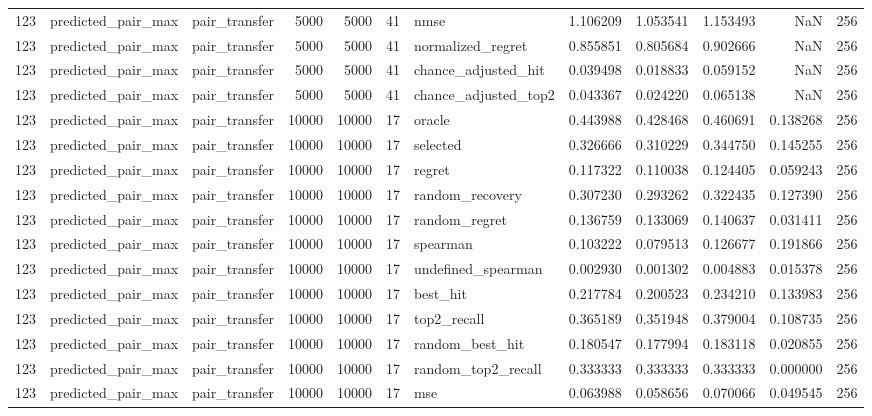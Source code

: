\begin{tabular}{rllrrrlrrrrr}
123 & predicted_pair_max & pair_transfer & 5000 & 5000 & 41 & nmse & 1.106209 & 1.053541 & 1.153493 & NaN & 256 \\
123 & predicted_pair_max & pair_transfer & 5000 & 5000 & 41 & normalized_regret & 0.855851 & 0.805684 & 0.902666 & NaN & 256 \\
123 & predicted_pair_max & pair_transfer & 5000 & 5000 & 41 & chance_adjusted_hit & 0.039498 & 0.018833 & 0.059152 & NaN & 256 \\
123 & predicted_pair_max & pair_transfer & 5000 & 5000 & 41 & chance_adjusted_top2 & 0.043367 & 0.024220 & 0.065138 & NaN & 256 \\
123 & predicted_pair_max & pair_transfer & 10000 & 10000 & 17 & oracle & 0.443988 & 0.428468 & 0.460691 & 0.138268 & 256 \\
123 & predicted_pair_max & pair_transfer & 10000 & 10000 & 17 & selected & 0.326666 & 0.310229 & 0.344750 & 0.145255 & 256 \\
123 & predicted_pair_max & pair_transfer & 10000 & 10000 & 17 & regret & 0.117322 & 0.110038 & 0.124405 & 0.059243 & 256 \\
123 & predicted_pair_max & pair_transfer & 10000 & 10000 & 17 & random_recovery & 0.307230 & 0.293262 & 0.322435 & 0.127390 & 256 \\
123 & predicted_pair_max & pair_transfer & 10000 & 10000 & 17 & random_regret & 0.136759 & 0.133069 & 0.140637 & 0.031411 & 256 \\
123 & predicted_pair_max & pair_transfer & 10000 & 10000 & 17 & spearman & 0.103222 & 0.079513 & 0.126677 & 0.191866 & 256 \\
123 & predicted_pair_max & pair_transfer & 10000 & 10000 & 17 & undefined_spearman & 0.002930 & 0.001302 & 0.004883 & 0.015378 & 256 \\
123 & predicted_pair_max & pair_transfer & 10000 & 10000 & 17 & best_hit & 0.217784 & 0.200523 & 0.234210 & 0.133983 & 256 \\
123 & predicted_pair_max & pair_transfer & 10000 & 10000 & 17 & top2_recall & 0.365189 & 0.351948 & 0.379004 & 0.108735 & 256 \\
123 & predicted_pair_max & pair_transfer & 10000 & 10000 & 17 & random_best_hit & 0.180547 & 0.177994 & 0.183118 & 0.020855 & 256 \\
123 & predicted_pair_max & pair_transfer & 10000 & 10000 & 17 & random_top2_recall & 0.333333 & 0.333333 & 0.333333 & 0.000000 & 256 \\
123 & predicted_pair_max & pair_transfer & 10000 & 10000 & 17 & mse & 0.063988 & 0.058656 & 0.070066 & 0.049545 & 256 \\

\end{tabular}
